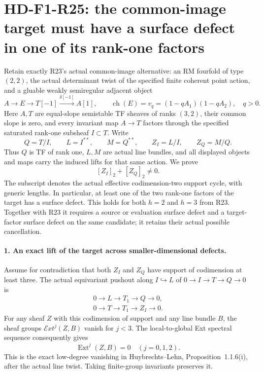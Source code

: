 \section[HD-F1-R25: target surface defects]{HD-F1-R25: the common-image target must have a surface defect in one of its rank-one factors}
\label{sec:followup-rm-common-image-target-surface}

Retain exactly R23's actual common-image alternative:
an RM fourfold of type $(2,2)$, the actual determinant
twist of the specified finite coherent point action,
and a gluable weakly semiregular adjacent object
\[
 A\longrightarrow E\longrightarrow T[-1]
       \xrightarrow{\delta[-1]}A[1],\qquad
 \operatorname{ch}(E)=v_q=(1-qA_1)(1-qA_2),\quad q>0.
 \tag{F1R25.1}
\]
Here $A,T$ are equal-slope semistable TF sheaves of
ranks $(3,2)$, their common slope is zero, and every
invariant map $A\to T$ factors through the specified
saturated rank-one subsheaf $I\subset T$. Write
\[
 Q=T/I,\qquad L=I^{**},\qquad M=Q^{**},\qquad
 Z_I=L/I,\qquad Z_Q=M/Q.
 \tag{F1R25.2}
\]
Thus $Q$ is TF of rank one, $L,M$ are actual line
bundles, and all displayed objects and maps carry
the induced lifts for that same action. We prove
\[
                [Z_I]_2+[Z_Q]_2\ne0.
 \tag{F1R25.3}
\]
The subscript denotes the actual effective
codimension-two support cycle, with generic
lengths. In particular, at least one of the two
rank-one factors of the target has a surface
defect. This holds for both $h=2$ and $h=3$
from R23. Together with R23 it requires a
source or evaluation surface defect and a
target-factor surface defect on the same
candidate; it retains their actual possible
cancellation.

\paragraph{1. An exact lift of the target across smaller-dimensional defects.}
Assume for contradiction that both $Z_I$ and $Z_Q$
have support of codimension at least three.
The actual equivariant pushout along $I\hookrightarrow L$
of $0\to I\to T\to Q\to0$ is
\[
 \begin{gathered}
 0\longrightarrow L\longrightarrow T_1
                     \longrightarrow Q\longrightarrow0,\\
 0\longrightarrow T\longrightarrow T_1
                     \longrightarrow Z_I\longrightarrow0.
 \end{gathered}
 \tag{F1R25.4}
\]
For any sheaf $Z$ with this codimension of support
and any line bundle $B$, the sheaf groups
$\mathcal Ext^j(Z,B)$ vanish for $j<3$.
The local-to-global Ext spectral sequence consequently
gives
\[
                         \operatorname{Ext}^j(Z,B)=0
                                  \quad(j=0,1,2).
 \tag{F1R25.5}
\]
This is the exact low-degree vanishing in
Huybrechts--Lehn, Proposition~1.1.6(i), after the
actual line twist. Taking finite-group invariants
preserves it.

